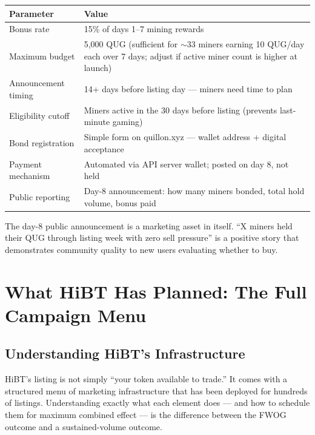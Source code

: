 \documentclass[11pt,a4paper]{article}
\begin{document}
\begin{center}
\begin{tabular}{L{4.5cm} L{8.5cm}}
  \toprule
  \textbf{Parameter} & \textbf{Value} \\
  \midrule
  Bonus rate & 15\% of days 1--7 mining rewards \\
  Maximum budget & 5,000 QUG (sufficient for $\sim$33 miners earning 10 QUG/day each over 7 days; adjust if active miner count is higher at launch) \\
  Announcement timing & 14+ days before listing day — miners need time to plan \\
  Eligibility cutoff & Miners active in the 30 days before listing (prevents last-minute gaming) \\
  Bond registration & Simple form on quillon.xyz — wallet address + digital acceptance \\
  Payment mechanism & Automated via API server wallet; posted on day 8, not held \\
  Public reporting & Day-8 announcement: how many miners bonded, total hold volume, bonus paid \\
  \bottomrule
\end{tabular}
\end{center}

The day-8 public announcement is a marketing asset in itself. ``X miners held their QUG through listing week with zero sell pressure'' is a positive story that demonstrates community quality to new users evaluating whether to buy.

\section{What HiBT Has Planned: The Full Campaign Menu}

\subsection{Understanding HiBT's Infrastructure}

HiBT's listing is not simply ``your token available to trade.'' It comes with a structured menu of marketing infrastructure that has been deployed for hundreds of listings. Understanding exactly what each element does — and how to schedule them for maximum combined effect — is the difference between the FWOG outcome and a sustained-volume outcome.
\end{document}
